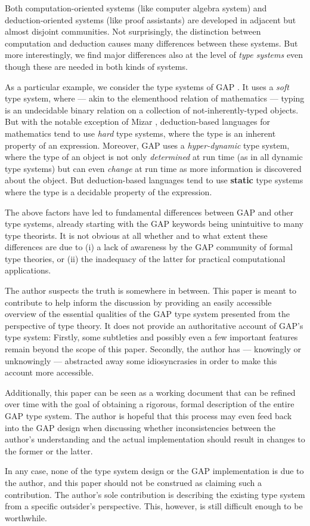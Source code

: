 Both computation-oriented systems (like computer algebra system) and deduction-oriented systems (like proof assistants) are developed in adjacent but almost disjoint communities.
Not surprisingly, the distinction between computation and deduction causes many differences between these systems.
But more interestingly, we find major differences also at the level of \emph{type systems} even though these are needed in both kinds of systems.

As a particular example, we consider the type systems of GAP \cite{gap}.
It uses a \emph{soft} type system, where --- akin to the elementhood relation of mathematics --- typing is an undecidable binary relation on a collection of not-inherently-typed objects.
But with the notable exception of Mizar \cite{mizar_types}, deduction-based languages for mathematics tend to use \emph{hard} type systems, where the type is an inherent property of an expression.
Moreover, GAP uses a \emph{hyper-dynamic} type system, where the type of an object is not only \emph{determined} at run time (as in all dynamic type systems) but can even \emph{change} at run time as more information is discovered about the object.
But deduction-based languages tend to use \textbf{static} type systems where the type is a decidable property of the expression.

The above factors have led to fundamental differences between GAP and other type systems, already starting with the GAP keywords being unintuitive to many type theorists.
It is not obvious at all whether and to what extent these differences are due to (i) a lack of awareness by the GAP community of formal type theories, or (ii) the inadequacy of the latter for practical computational applications.

The author suspects the truth is somewhere in between.
This paper is meant to contribute to help inform the discussion by providing an easily accessible overview of the essential qualities of the GAP type system presented from the perspective of type theory.
It does not provide an authoritative account of GAP's type system:
Firstly, some subtleties and possibly even a few important features remain beyond the scope of this paper.
Secondly, the author has --- knowingly or unknowingly --- abstracted away some idiosyncrasies in order to make this account more accessible.

Additionally, this paper can be seen as a working document that can be refined over time with the goal of obtaining a rigorous, formal description of the entire GAP type system.
The author is hopeful that this process may even feed back into the GAP design when discussing whether inconsistencies between the author's understanding and the actual implementation should result in changes to the former or the latter.

In any case, none of the type system design or the GAP implementation is due to the author, and this paper should not be construed as claiming such a contribution.
The author's sole contribution is describing the existing type system from a specific outsider's perspective.
This, however, is still difficult enough to be worthwhile.
